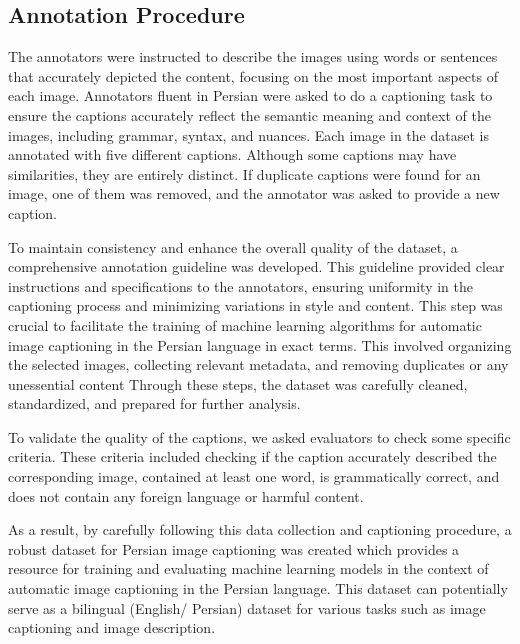\documentclass[runningheads]{llncs}
\begin{document}
\subsection{Annotation Procedure}
The annotators were instructed to describe the images using words or sentences that accurately depicted the content, focusing on the most important aspects of each image. Annotators fluent in Persian were asked to do a captioning task to ensure the captions accurately reflect the semantic meaning and context of the images, including grammar, syntax, and nuances. Each image in the dataset is annotated with five different captions. Although some captions may have similarities, they are entirely distinct. If duplicate captions were found for an image, one of them was removed, and the annotator was asked to provide a new caption.

To maintain consistency and enhance the overall quality of the dataset, a comprehensive annotation guideline was developed. This guideline provided clear instructions and specifications to the annotators, ensuring uniformity in the captioning process and minimizing variations in style and content. This step was crucial to facilitate the training of machine learning algorithms for automatic image captioning in the Persian language in exact terms. This involved organizing the selected images, collecting relevant metadata, and removing duplicates or any unessential content Through these steps, the dataset was carefully cleaned, standardized, and prepared for further analysis. 

To validate the quality of the captions, we asked evaluators to check some specific criteria. These criteria included checking if the caption accurately described the corresponding image, contained at least one word, is grammatically correct, and does not contain any foreign language or harmful content. 

As a result, by carefully following this data collection and captioning procedure, a robust dataset for Persian image captioning was created which provides a resource for training and evaluating machine learning models in the context of automatic image captioning in the Persian language. This dataset can potentially serve as a bilingual (English/ Persian) dataset for various tasks such as image captioning and image description.
\end{document}
